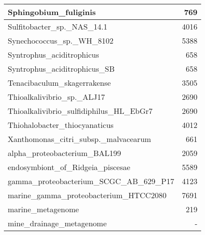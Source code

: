 \documentclass[12pt,a4paper]{article}
\begin{document}
\begin{table}[ht]
\begin{center}
\begin{tabular}{|l*{1}{|r}|}
Sphingobium\_fuliginis & 769 \\ \hline
Sulfitobacter\_sp.\_NAS\_14.1 & 4016 \\ \hline
Synechococcus\_sp.\_WH\_8102 & 5388 \\ \hline
Syntrophus\_aciditrophicus & 658 \\ \hline
Syntrophus\_aciditrophicus\_SB & 658 \\ \hline
Tenacibaculum\_skagerrakense & 3505 \\ \hline
Thioalkalivibrio\_sp.\_ALJ17 & 2690 \\ \hline
Thioalkalivibrio\_sulfidiphilus\_HL\_EbGr7 & 2690 \\ \hline
Thiohalobacter\_thiocyanaticus & 4012 \\ \hline
Xanthomonas\_citri\_subsp.\_malvacearum & 661 \\ \hline
alpha\_proteobacterium\_BAL199 & 2059 \\ \hline
endosymbiont\_of\_Ridgeia\_piscesae & 5589 \\ \hline
gamma\_proteobacterium\_SCGC\_AB\_629\_P17 & 4123 \\ \hline
marine\_gamma\_proteobacterium\_HTCC2080 & 7691 \\ \hline
marine\_metagenome & 219 \\ \hline
mine\_drainage\_metagenome & - \\ \hline
\end{tabular}
\end{center}
\end{table}
\end{document}
